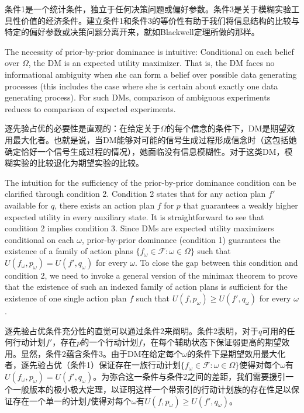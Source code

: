\documentclass[12pt,a4paper]{article}
\newenvironment{original}
  {\par\vspace{4pt}\noindent\color{black}\ignorespaces}
  {\par\vspace{2pt}}
\newenvironment{translation}
  {\par\vspace{2pt}\noindent\color{myblue}\ignorespaces}
  {\par\vspace{6pt}}
\newcommand{\calF}{\mathcal{F}}
\begin{document}
\begin{translation}
条件1是一个统计条件，独立于任何决策问题或偏好参数。条件3是关于模糊实验工具性价值的经济条件。建立条件1和条件3的等价性有助于我们将信息结构的比较与特定的偏好参数或决策问题分离开来，就如Blackwell定理所做的那样。
\end{translation}

\begin{original}
The necessity of prior-by-prior dominance is intuitive: Conditional on each belief over $\Omega$, the DM is an expected utility maximizer. That is, the DM faces no informational ambiguity when she can form a belief over possible data generating processes (this includes the case where she is certain about exactly one data generating process). For such DMs, comparison of ambiguous experiments reduces to comparison of expected experiments.
\end{original}

\begin{translation}
逐先验占优的必要性是直观的：在给定关于$\Omega$的每个信念的条件下，DM是期望效用最大化者。也就是说，当DM能够对可能的信号生成过程形成信念时（这包括她确定恰好一个信号生成过程的情况），她面临没有信息模糊性。对于这类DM，模糊实验的比较退化为期望实验的比较。
\end{translation}

\begin{original}
The intuition for the sufficiency of the prior-by-prior dominance condition can be clarified through condition 2. Condition 2 states that for any action plan $f'$ available for $q$, there exists an action plan $f$ for $p$ that guarantees a weakly higher expected utility in every auxiliary state. It is straightforward to see that condition 2 implies condition 3. Since DMs are expected utility maximizers conditional on each $\omega$, prior-by-prior dominance (condition 1) guarantees the existence of a family of action plans $\{f_{\omega}\in\calF:\omega\in\Omega\}$ such that $U(f_{\omega},p_{\omega})=U(f',q_{\omega})$ for every $\omega$. To close the gap between this condition and condition 2, we need to invoke a general version of the minimax theorem to prove that the existence of such an indexed family of action plans is sufficient for the existence of one single action plan $f$ such that $U(f,p_{\omega})\geq U(f',q_{\omega})$ for every $\omega$.
\end{original}

\begin{translation}
逐先验占优条件充分性的直觉可以通过条件2来阐明。条件2表明，对于$q$可用的任何行动计划$f'$，存在$p$的一个行动计划$f$，在每个辅助状态下保证弱更高的期望效用。显然，条件2蕴含条件3。由于DM在给定每个$\omega$的条件下是期望效用最大化者，逐先验占优（条件1）保证存在一族行动计划$\{f_{\omega}\in\calF:\omega\in\Omega\}$使得对每个$\omega$有$U(f_{\omega},p_{\omega})=U(f',q_{\omega})$。为弥合这一条件与条件2之间的差距，我们需要援引一个一般版本的极小极大定理，以证明这样一个带索引的行动计划族的存在性足以保证存在一个单一的计划$f$使得对每个$\omega$有$U(f,p_{\omega})\geq U(f',q_{\omega})$。
\end{translation}
\end{document}
